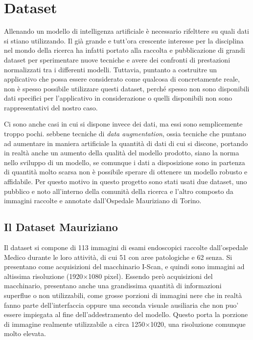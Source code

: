

\section{\label{sec:Dataset}Dataset}

Allenando un modello di intelligenza artificiale è necessario
rifelttere su quali dati si stiano utilizzando.
Il già grande e tutt'ora crescente interesse per la disciplina
nel mondo della ricerca ha infatti portato alla raccolta
e pubblicazione di grandi dataset per sperimentare
nuove tecniche e avere dei confronti di prestazioni
normalizzati tra i differenti modelli.
Tuttavia, puntanto a costruitre un applicativo che possa essere
considerato come qualcosa di concretamente reale, non è
spesso possibile utilizzare questi dataset, perché
spesso non sono disponibili dati specifici per l'applicativo
in considerazione o quelli disponibili non sono rappresentativi
del nostro caso.

Ci sono anche casi in cui si dispone invece dei dati, ma
essi sono semplicemente troppo pochi.
sebbene tecniche di {\it data augmentation}, ossia tecniche
che puntano ad aumentare in maniera artificiale la quantità
di dati di cui si discone, portando in realtà anche un
aumento della qualità del modello prodotto, siano la norma
nello sviluppo di un modello, se comunque i dati a disposizione
sono in partenza di quantità molto scarsa non è possibile
sperare di ottenere un modello robusto e affidabile.
Per questo motivo in questo progetto sono stati usati due
dataset, uno pubblico e noto all'interno della comunità
della ricerca e l'altro composto da immagini raccolte e
annotate dall'Ospedale Mauriziano di Torino.

\subsection{\label{sec:dataset-mauriziano}Il Dataset Mauriziano}

Il dataset si compone di 113 immagini di esami endoscopici
raccolte dall'ospedale Medico durante le loro attività,
di cui 51 con aree patologiche e 62 senza.
Si presentano come acquisizioni del macchinario I-Scan,
e quindi sono immagini ad altissima risoluzione (1920$\times$1080 pixel).
Essendo però acquisizioni del macchinario, presentano anche
una grandissima quantità di informazioni superflue o non utilizzabili,
come grosse porzioni di immagini nere che in realtà fanno parte
dell'interfaccia oppure una seconda visuale ausiliaria che non
puo' essere impiegata al fine dell'addestramento del modello.
Questo porta la porzione di immagine realmente utilizzabile
a circa 1250$\times$1020, una risoluzione comunque molto
elevata.

